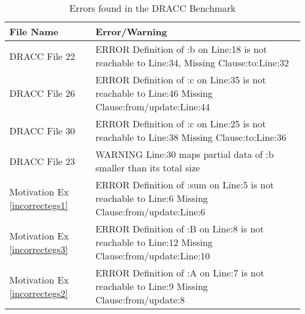 \begin{table}
    \caption{Errors found in the DRACC Benchmark}
    \label{dracc-errors}
    \begin{center}
        \scriptsize
        \begin{tabular}{ |m{1.5in} | m{3in} |}
            \hline
           File Name & Error/Warning \\ \hline    
           DRACC File 22  & ERROR Definition of :b on Line:18 is not reachable to Line:34, Missing Clause:to:Line:32 \\ \hline    
           DRACC File 26 & ERROR Definition of :c on Line:35 is not reachable to Line:46 Missing Clause:from/update:Line:44 \\ \hline 
           DRACC File 30 & ERROR Definition of :c on Line:25 is not reachable to Line:38 Missing Clause:to:Line:36 \\ \hline 
           DRACC File 23 & WARNING Line:30 maps partial data of :b smaller than its total size   \\ \hline 
           Motivation Ex \autoref{incorrectegs1} & 
           ERROR Definition of :sum on Line:5 is not 
           reachable to Line:6 Missing Clause:from/update:Line:6 \\ \hline  
           Motivation Ex \autoref{incorrectegs3} & 
           ERROR Definition of :B on Line:8 is not
           reachable to Line:12 Missing Clause:from/update:Line:10 
           \\ \hline 
           Motivation Ex \autoref{incorrectegs2} &
           ERROR Definition of :A on Line:7 is not 
           reachable to Line:9 Missing Clause:from/update:8
           \\ \hline                              
        \end{tabular}        
    \end{center}
\end{table} \vspace{-30pt}
